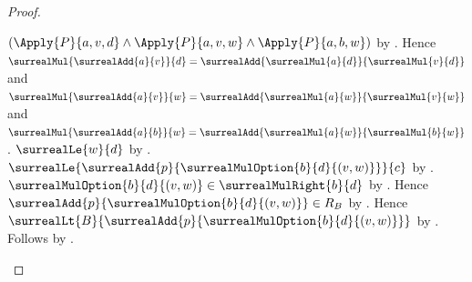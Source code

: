 \begin{proof}
\begin{subproof}
\begin{subproof}
\begin{byCase}
\begin{byCase}
                            $(\Apply{P}{a,v,d}
                              \land\Apply{P}{a,v,w}
                              \land\Apply{P}{a,b,w})$
                                by \auto.
                            Hence
                                $\surrealMul{\surrealAdd{a}{v}}{d}
                                    =\surrealAdd{\surrealMul{a}{d}}
                                        {\surrealMul{v}{d}}$ and
                                $\surrealMul{\surrealAdd{a}{v}}{w}
                                    =\surrealAdd{\surrealMul{a}{w}}
                                        {\surrealMul{v}{w}}$ and
                                $\surrealMul{\surrealAdd{a}{b}}{w}
                                    =\surrealAdd{\surrealMul{a}{w}}
                                        {\surrealMul{b}{w}}$.
                            $\surrealLe{w}{d}$
                                by .
                            $\surrealLe
                                {\surrealAdd{p}
                                    {\surrealMulOption{b}{d}{(v,w)}}}
                                {c}$
                                by
                                .
                            $\surrealMulOption{b}{d}{(v,w)}
                                \in\surrealMulRight{b}{d}$
                                by .
                            Hence $\surrealAdd{p}
                                {\surrealMulOption{b}{d}{(v,w)}}
                                \in R_B$
                                by .
                            Hence $\surrealLt{B}
                                {\surrealAdd{p}
                                    {\surrealMulOption{b}{d}{(v,w)}}}$
                                by .
                            Follows by
                                .
                    \end{byCase}
            \end{byCase}
        \end{subproof}


\end{subproof}
\end{proof}
